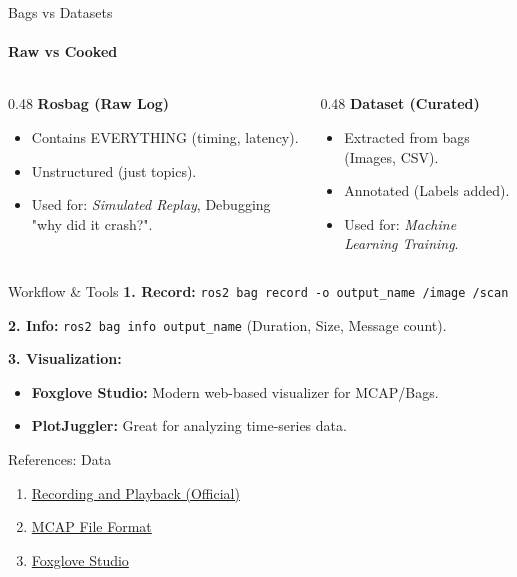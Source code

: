 \documentclass[aspectratio=169]{beamer}
\begin{document}
\begin{frame}{Bags vs Datasets}
    \framesubtitle{Raw vs Cooked}
    \begin{columns}
        \begin{column}{0.48\textwidth}
            \textbf{Rosbag (Raw Log)}
            \begin{itemize}
                \item Contains EVERYTHING (timing, latency).
                \item Unstructured (just topics).
                \item Used for: \textit{Simulated Replay}, Debugging "why did it crash?".
            \end{itemize}
        \end{column}
        \begin{column}{0.48\textwidth}
            \textbf{Dataset (Curated)}
            \begin{itemize}
                \item Extracted from bags (Images, CSV).
                \item Annotated (Labels added).
                \item Used for: \textit{Machine Learning Training}.
            \end{itemize}
        \end{column}
    \end{columns}
\end{frame}

\begin{frame}{Workflow \& Tools}
    \textbf{1. Record:}
    \texttt{ros2 bag record -o output\_name /image /scan}
    
    \textbf{2. Info:}
    \texttt{ros2 bag info output\_name} (Duration, Size, Message count).

    \textbf{3. Visualization:}
    \begin{itemize}
        \item \textbf{Foxglove Studio:} Modern web-based visualizer for MCAP/Bags.
        \item \textbf{PlotJuggler:} Great for analyzing time-series data.
    \end{itemize}
\end{frame}

\begin{frame}{References: Data}
    \begin{enumerate}
        \item [EN] \href{https://docs.ros.org/en/humble/Tutorials/Beginner-CLI-Tools/Recording-And-Playing-Back-Data/Recording-And-Playing-Back-Data.html}{Recording and Playback (Official)}
        \item [EN] \href{https://mcap.dev/}{MCAP File Format}
        \item [EN] \href{https://foxglove.dev/}{Foxglove Studio}
    \end{enumerate}
\end{frame}
\end{document}
